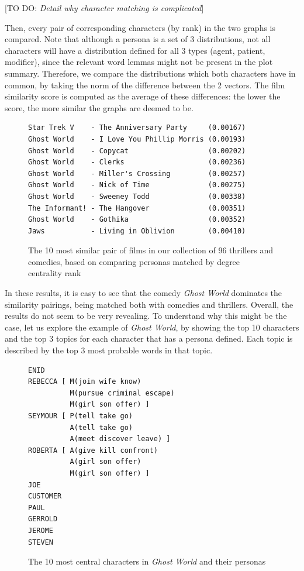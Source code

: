 \documentclass[bsc,frontabs,singlespacing,parskip, twoside]{infthesis}
\begin{document}
[TO DO: \textit{Detail why character matching is complicated}]

Then, every pair of corresponding characters (by rank) in the two graphs is compared. Note that although a persona is a set of 3 distributions, not all characters will have a distribution defined for all 3 types (agent, patient, modifier), since the relevant word lemmas might not be present in the plot summary. Therefore, we compare the distributions which both characters have in common, by taking the norm of the difference between the 2 vectors. The film similarity score is computed as the average of these differences: the lower the score, the more similar the graphs are deemed to be.

\begin{figure}[h]
\centering
\begin{minipage}{11.5cm}
\begin{Verbatim}[frame=single]
Star Trek V    - The Anniversary Party     (0.00167)
Ghost World    - I Love You Phillip Morris (0.00193)
Ghost World    - Copycat                   (0.00202)
Ghost World    - Clerks                    (0.00236)
Ghost World    - Miller's Crossing         (0.00257)
Ghost World    - Nick of Time              (0.00275)
Ghost World    - Sweeney Todd              (0.00338)
The Informant! - The Hangover              (0.00351)
Ghost World    - Gothika                   (0.00352)
Jaws           - Living in Oblivion        (0.00410)
\end{Verbatim}
\end{minipage}
\caption{The 10 most similar pair of films in our collection of 96 thrillers and comedies, based on comparing personas matched by degree centrality rank}
\end{figure}

In these results, it is easy to see that the comedy \textit{Ghost World} dominates the similarity pairings, being matched both with comedies and thrillers. Overall, the results do not seem to be very revealing. To understand why this might be the case, let us explore the example of \textit{Ghost World}, by showing the top 10 characters and the top 3 topics for each character that has a persona defined. Each topic is described by the top 3 most probable words in that topic.

\begin{figure}[h]
\centering
\begin{minipage}{9cm}
\begin{Verbatim}[frame=single]
ENID 
REBECCA [ M(join wife know)
          M(pursue criminal escape)
          M(girl son offer) ]
SEYMOUR [ P(tell take go)
          A(tell take go)
          A(meet discover leave) ]
ROBERTA [ A(give kill confront)
          A(girl son offer)
          M(girl son offer) ]
JOE 
CUSTOMER 
PAUL 
GERROLD 
JEROME 
STEVEN 
\end{Verbatim}

\end{minipage}
\caption{The 10 most central characters in \textit{Ghost World} and their personas}
\end{figure}
\end{document}
